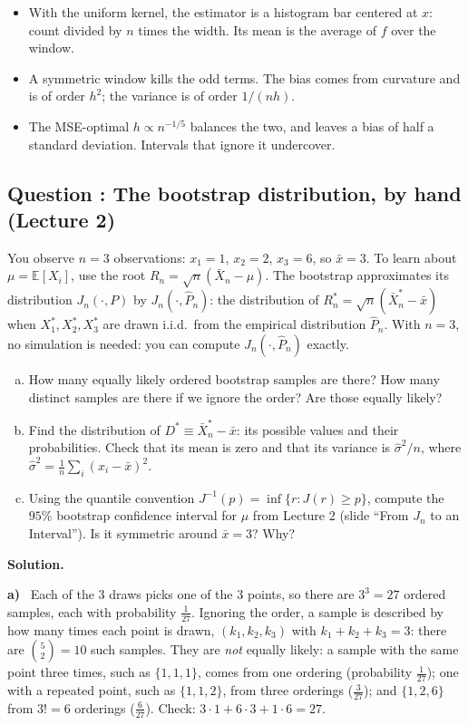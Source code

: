 \documentclass[11pt]{article}
\newcommand{\E}{\mathbb{E}}
\newcounter{question}
\newcommand{\question}[1]{
	\stepcounter{question}
	\subsection*{Question \thequestion: #1}
}
\newcommand{\itm}[1]{\par\needspace{4\baselineskip}\textbf{#1)}\ }
\newcommand{\solution}{\par\textcolor{FGVBlue}{\textbf{Solution.}}\par}
\begin{document}
\begin{takeaway}
\begin{itemize}
	\item With the uniform kernel, the estimator is a histogram bar centered at $x$: count divided by $n$ times the width. Its mean is the average of $f$ over the window.
	\item A symmetric window kills the odd terms. The bias comes from curvature and is of order $h^2$; the variance is of order $1/(nh)$.
	\item The MSE-optimal $h\propto n^{-1/5}$ balances the two, and leaves a bias of half a standard deviation. Intervals that ignore it undercover.
\end{itemize}
\end{takeaway}

\question{The bootstrap distribution, by hand (Lecture 2)}

You observe $n=3$ observations: $x_1=1$, $x_2=2$, $x_3=6$, so $\bar x=3$. To learn about $\mu=\E[X_i]$, use the root $R_n=\sqrt n(\bar X_n-\mu)$. The bootstrap approximates its distribution $J_n(\cdot,P)$ by $J_n(\cdot,\hat P_n)$: the distribution of $R^*_n=\sqrt n(\bar X^*_n-\bar x)$ when $X^*_1,X^*_2,X^*_3$ are drawn i.i.d.\ from the empirical distribution $\hat P_n$. With $n=3$, no simulation is needed: you can compute $J_n(\cdot,\hat P_n)$ exactly.
\begin{enumerate}[a)]
	\item How many equally likely ordered bootstrap samples are there? How many distinct samples are there if we ignore the order? Are those equally likely?
	\item Find the distribution of $D^*\equiv\bar X^*_n-\bar x$: its possible values and their probabilities. Check that its mean is zero and that its variance is $\hat\sigma^2/n$, where $\hat\sigma^2=\frac1n\sum_i(x_i-\bar x)^2$.
	\item Using the quantile convention $J^{-1}(p)=\inf\{r:J(r)\ge p\}$, compute the $95\%$ bootstrap confidence interval for $\mu$ from Lecture 2 (slide ``From $J_n$ to an Interval''). Is it symmetric around $\bar x=3$? Why?
\end{enumerate}

\solution
\itm{a}
Each of the 3 draws picks one of the 3 points, so there are $3^3=27$ ordered samples, each with probability $\frac1{27}$. Ignoring the order, a sample is described by how many times each point is drawn, $(k_1,k_2,k_3)$ with $k_1+k_2+k_3=3$: there are $\binom{5}{2}=10$ such samples. They are \emph{not} equally likely: a sample with the same point three times, such as $\{1,1,1\}$, comes from one ordering (probability $\frac1{27}$); one with a repeated point, such as $\{1,1,2\}$, from three orderings ($\frac3{27}$); and $\{1,2,6\}$ from $3!=6$ orderings ($\frac6{27}$). Check: $3\cdot1+6\cdot3+1\cdot6=27$.
\end{document}
